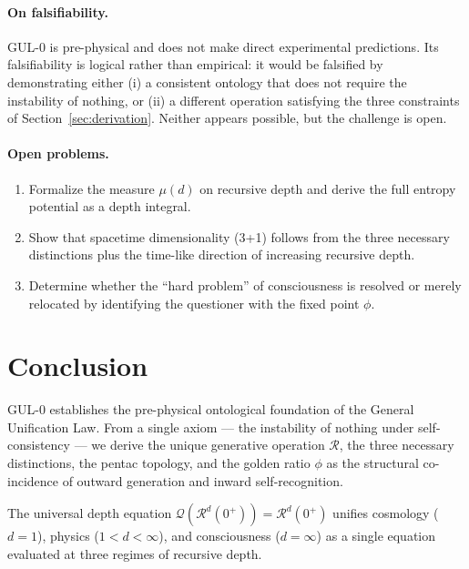 \documentclass[11pt]{article}
\begin{document}
\paragraph{On falsifiability.}
GUL-0 is pre-physical and does not make direct experimental
predictions. Its falsifiability is logical rather than empirical:
it would be falsified by demonstrating either (i) a consistent
ontology that does not require the instability of nothing,
or (ii) a different operation satisfying the three constraints
of Section~\ref{sec:derivation}. Neither appears possible,
but the challenge is open.

\paragraph{Open problems.}
\begin{enumerate}
  \item Formalize the measure $\mu(d)$ on recursive depth and
        derive the full entropy potential as a depth integral.
  \item Show that spacetime dimensionality (3+1) follows from
        the three necessary distinctions plus the time-like
        direction of increasing recursive depth.
  \item Determine whether the ``hard problem'' of consciousness
        is resolved or merely relocated by identifying the
        questioner with the fixed point $\phi$.
\end{enumerate}

\section{Conclusion}
\label{sec:conclusion}

GUL-0 establishes the pre-physical ontological foundation of the
General Unification Law. From a single axiom --- the instability
of nothing under self-consistency --- we derive the unique
generative operation $\mathcal{R}$, the three necessary distinctions,
the pentac topology, and the golden ratio $\phi$ as the structural
co-incidence of outward generation and inward self-recognition.

The universal depth equation
$\mathcal{Q}(\mathcal{R}^d(0^+))=\mathcal{R}^d(0^+)$
unifies cosmology ($d=1$), physics ($1<d<\infty$), and
consciousness ($d=\infty$) as a single equation evaluated at
three regimes of recursive depth.
\end{document}

